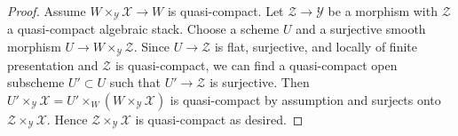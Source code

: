 \documentclass[10pt,a4paper]{amsart}
\theoremstyle{plain}
\theoremstyle{definition}
\theoremstyle{remark}
\numberwithin{equation}{subsection}
\begin{document}
\begin{proof}
Assume $W \times_\mathcal{Y} \mathcal{X} \to W$ is quasi-compact.
Let $\mathcal{Z} \to \mathcal{Y}$ be a morphism with $\mathcal{Z}$
a quasi-compact algebraic stack. Choose a scheme $U$ and a surjective
smooth morphism
$U \to W \times_\mathcal{Y} \mathcal{Z}$.
Since $U \to \mathcal{Z}$ is flat, surjective, and locally of finite
presentation and $\mathcal{Z}$ is quasi-compact, we can find a
quasi-compact open subscheme $U' \subset U$ such that
$U' \to \mathcal{Z}$ is surjective.
Then
$U' \times_\mathcal{Y} \mathcal{X} =
U' \times_W (W \times_\mathcal{Y} \mathcal{X})$
is quasi-compact by assumption and surjects onto
$\mathcal{Z} \times_\mathcal{Y} \mathcal{X}$.
Hence $\mathcal{Z} \times_\mathcal{Y} \mathcal{X}$
is quasi-compact as desired.
\end{proof}
\end{document}
